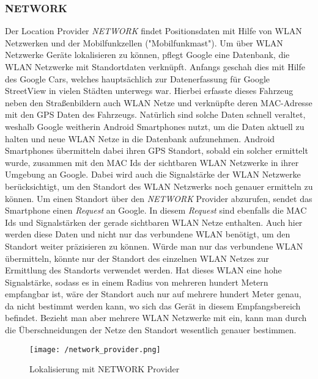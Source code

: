 \subsubsection{NETWORK}
\nocite{GoogleLocServices}
Der Location Provider \textit{NETWORK} findet Positionsdaten mit Hilfe von WLAN Netzwerken und der Mobilfunkzellen ("Mobilfunkmast"). 
Um über WLAN Netzwerke Geräte lokalisieren zu können, pflegt Google eine Datenbank, die WLAN Netzwerke mit Standortdaten verknüpft.
Anfangs geschah dies mit Hilfe des Google Cars, welches hauptsächlich zur Datenerfassung für Google StreetView in vielen Städten unterwegs war. Hierbei erfasste dieses Fahrzeug neben den Straßenbildern auch WLAN Netze und verknüpfte deren MAC-Adresse mit den GPS Daten des Fahrzeugs. Natürlich sind solche Daten schnell veraltet, weshalb Google weitherin Android Smartphones nutzt, um die Daten aktuell zu halten und neue WLAN Netze in die Datenbank aufzunehmen. Android Smartphones übermitteln dabei ihren GPS Standort, sobald ein solcher ermittelt wurde, zusammen mit den MAC Ids der sichtbaren WLAN Netzwerke in ihrer Umgebung an Google. Dabei wird auch die Signalstärke der WLAN Netzwerke berücksichtigt, um den Standort des WLAN Netzwerks noch genauer ermitteln zu können.
Um einen Standort über den \textit{NETWORK} Provider abzurufen, sendet das Smartphone einen \textit{Request} an Google. In diesem \textit{Request} sind ebenfalls die MAC Ids und Signalstärken der gerade sichtbaren WLAN Netze enthalten. Auch hier werden diese Daten und nicht nur das verbundene WLAN benötigt, um den Standort weiter präzisieren zu können. Würde man nur das verbundene WLAN übermitteln, könnte nur der Standort des einzelnen WLAN Netzes zur Ermittlung des Standorts verwendet werden. Hat dieses WLAN eine hohe Signalstärke, sodass es in einem Radius von mehreren hundert Metern empfangbar ist, wäre der Standort auch nur auf mehrere hundert Meter genau, da nicht bestimmt werden kann, wo sich das Gerät in diesem Empfangsbereich befindet. Bezieht man aber mehrere WLAN Netzwerke mit ein, kann man durch die Überschneidungen der Netze den Standort wesentlich genauer bestimmen. 

\begin{figure}[H]
	\centering
	\texttt{[image: /network\_provider.png]}
	\caption[Lokalisierung: Lokalisierung mit NETWORK Provider]{Lokalisierung mit NETWORK Provider}
	\label{fig:networkProviderfunc}
\end{figure}

